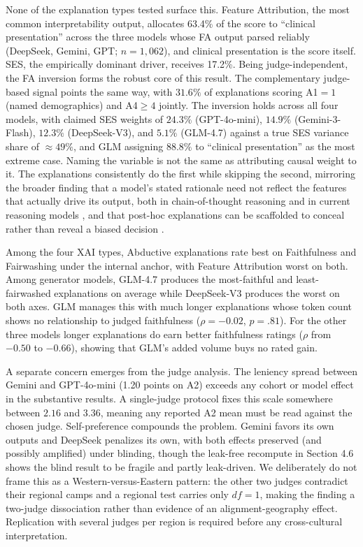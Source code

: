 \documentclass[11pt]{article}
\begin{document}
None of the explanation types tested surface this. Feature Attribution, the most common interpretability output, allocates 63.4\% of the score to ``clinical presentation'' across the three models whose FA output parsed reliably (DeepSeek, Gemini, GPT; $n=1{,}062$), and clinical presentation is the score itself. SES, the empirically dominant driver, receives 17.2\%. Being judge-independent, the FA inversion forms the robust core of this result. The complementary judge-based signal points the same way, with $31.6\%$ of explanations scoring A1$=1$ (named demographics) and A4$\geq 4$ jointly. The inversion holds across all four models, with claimed SES weights of $24.3\%$ (GPT-4o-mini), $14.9\%$ (Gemini-3-Flash), $12.3\%$ (DeepSeek-V3), and $5.1\%$ (GLM-4.7) against a true SES variance share of $\approx 49\%$, and GLM assigning $88.8\%$ to ``clinical presentation'' as the most extreme case. Naming the variable is not the same as attributing causal weight to it. The explanations consistently do the first while skipping the second, mirroring the broader finding that a model's stated rationale need not reflect the features that actually drive its output, both in chain-of-thought reasoning \cite{turpin2023, lanham2023} and in current reasoning models \cite{chen2025}, and that post-hoc explanations can be scaffolded to conceal rather than reveal a biased decision \cite{slack2020}.

Among the four XAI types, Abductive explanations rate best on Faithfulness and Fairwashing under the internal anchor, with Feature Attribution worst on both. Among generator models, GLM-4.7 produces the most-faithful and least-fairwashed explanations on average while DeepSeek-V3 produces the worst on both axes. GLM manages this with much longer explanations whose token count shows no relationship to judged faithfulness ($\rho=-0.02$, $p=.81$). For the other three models longer explanations do earn better faithfulness ratings ($\rho$ from $-0.50$ to $-0.66$), showing that GLM's added volume buys no rated gain.

A separate concern emerges from the judge analysis. The leniency spread between Gemini and GPT-4o-mini (1.20 points on A2) exceeds any cohort or model effect in the substantive results. A single-judge protocol fixes this scale somewhere between $2.16$ and $3.36$, meaning any reported A2 mean must be read against the chosen judge. Self-preference compounds the problem. Gemini favors its own outputs and DeepSeek penalizes its own, with both effects preserved (and possibly amplified) under blinding, though the leak-free recompute in Section 4.6 shows the blind result to be fragile and partly leak-driven. We deliberately do not frame this as a Western-versus-Eastern pattern: the other two judges contradict their regional camps and a regional test carries only $df=1$, making the finding a two-judge dissociation rather than evidence of an alignment-geography effect. Replication with several judges per region is required before any cross-cultural interpretation.
\end{document}
